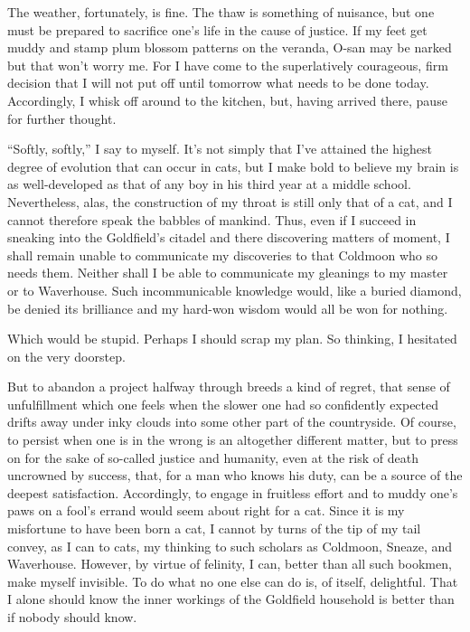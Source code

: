 \documentclass{book}
\begin{document}
The weather, fortunately, is fine. The thaw is something of nuisance,
but one must be prepared to sacrifice one's life in the cause of
justice. If my feet get muddy and stamp plum blossom patterns on the
veranda, O-san may be narked but that won't worry me. For I have come to
the superlatively courageous, firm decision that I will not put off
until tomorrow what needs to be done today. Accordingly, I whisk off
around to the kitchen, but, having arrived there, pause for further
thought.

``Softly, softly,'' I say to myself. It's not simply that I've attained
the highest degree of evolution that can occur in cats, but I make bold
to believe my brain is as well-developed as that of any boy in his third
year at a middle school. Nevertheless, alas, the construction of my
throat is still only that of a cat, and I cannot therefore speak the
babbles of mankind. Thus, even if I succeed in sneaking into the
Goldfield's citadel and there discovering matters of moment, I shall
remain unable to communicate my discoveries to that Coldmoon who so
needs them. Neither shall I be able to communicate my gleanings to my
master or to Waverhouse. Such incommunicable knowledge would, like a
buried diamond, be denied its brilliance and my hard-won wisdom would
all be won for nothing.

Which would be stupid. Perhaps I should scrap my plan. So thinking, I
hesitated on the very doorstep.

But to abandon a project halfway through breeds a kind of regret, that
sense of unfulfillment which one feels when the slower one had so
confidently expected drifts away under inky clouds into some other part
of the countryside. Of course, to persist when one is in the wrong is an
altogether different matter, but to press on for the sake of so-called
justice and humanity, even at the risk of death uncrowned by success,
that, for a man who knows his duty, can be a source of the deepest
satisfaction. Accordingly, to engage in fruitless effort and to muddy
one's paws on a fool's errand would seem about right for a cat. Since it
is my misfortune to have been born a cat, I cannot by turns of the tip
of my tail convey, as I can to cats, my thinking to such scholars as
Coldmoon, Sneaze, and Waverhouse. However, by virtue of felinity, I can,
better than all such bookmen, make myself invisible. To do what no one
else can do is, of itself, delightful. That I alone should know the
inner workings of the Goldfield household is better than if nobody
should know.
\end{document}
